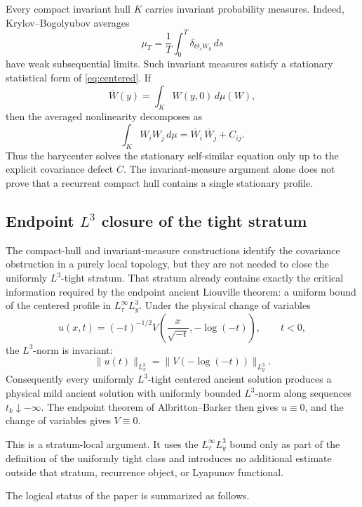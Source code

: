\documentclass[11pt]{amsart}
\theoremstyle{plain}
\theoremstyle{definition}
\theoremstyle{remark}
\numberwithin{equation}{section}
\begin{document}
Every compact invariant hull \(K\) carries invariant probability measures.
Indeed, Krylov--Bogolyubov averages
\[
   \mu_T=\frac1T\int_0^T\delta_{\Theta_sW_0}\,ds
\]
have weak subsequential limits.  Such invariant measures satisfy a stationary
statistical form of \eqref{eq:centered}.  If
\[
   \overline W(y)=\int_K W(y,0)\,d\mu(W),
\]
then the averaged nonlinearity decomposes as
\[
   \int_K W_iW_j\,d\mu
   =
   \overline W_i\,\overline W_j+C_{ij}.
\]
Thus the barycenter solves the stationary self-similar equation only up to the
explicit covariance defect \(C\).  The invariant-measure argument alone does
not prove that a recurrent compact hull contains a single stationary profile.

\subsection{\texorpdfstring{Endpoint \(L^3\) closure of the tight stratum}{Endpoint L3 closure of the tight stratum}}

The compact-hull and invariant-measure constructions identify the covariance
obstruction in a purely local topology, but they are not needed to close the
uniformly \(L^3\)-tight stratum.  That stratum already contains exactly the
critical information required by the endpoint ancient Liouville theorem: a
uniform bound of the centered profile in \(L^\infty_\tau L^3_y\).  Under the
physical change of variables
\[
   u(x,t)=(-t)^{-1/2}
   V\left(\frac{x}{\sqrt{-t}},-\log(-t)\right),
   \qquad t<0,
\]
the \(L^3\)-norm is invariant:
\[
   \|u(t)\|_{L^3_x}
   =
   \|V(-\log(-t))\|_{L^3_y}.
\]
Consequently every uniformly \(L^3\)-tight centered ancient solution produces
a physical mild ancient solution with uniformly bounded \(L^3\)-norm along
sequences \(t_k\downarrow-\infty\).  The endpoint theorem of
Albritton--Barker \cite{AlbrittonBarker2019} then gives \(u\equiv0\), and the
change of variables gives \(V\equiv0\).

This is a stratum-local argument.  It uses the \(L^\infty_\tau L^3_y\) bound
only as part of the definition of the uniformly tight class and introduces no
additional estimate outside that stratum, recurrence object, or Lyapunov
functional.

The logical status of the paper is summarized as follows.
\end{document}

